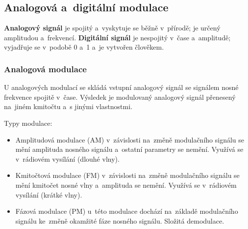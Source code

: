 \subsection{Analogová a~digitální modulace}

\textbf{Analogový signál} je spojitý a~vyskytuje se běžně v~přírodě; je určený amplitudou a~frekvencí. \textbf{Digitální signál} je nespojitý v~čase a~amplitudě; vyjadřuje se v~podobě 0 a~1 a~je vytvořen člověkem.

\subsubsection{Analogová modulace}

U analogových modulací se skládá vstupní analogový signál se signálem nosné frekvence spojitě v~čase. Výsledek je modulovaný analogový signál přenesený na~jiném kmitočtu a~s jinými vlastnostmi.

Typy modulace:
\begin{itemize}[noitemsep]
    \item Amplitudová modulace (AM) v~závislosti na~změně modulačního signálu se mění amplituda nosného signálu a~ostatní parametry se nemění. Využívá se v~rádiovém vysílání (dlouhé vlny).
    \item Kmitočtová modulace (FM) v~závislosti na~změně modulačního signálu se mění kmitočet nosné vlny a~amplituda se nemění. Využívá se v~rádiovém vysílání (krátké vlny).
    \item Fázová modulace (PM) u~této modulace dochází na~základě modulačního signálu ke~změně okamžité fáze nosného signálu. Složitá demodulace.
\end{itemize}

